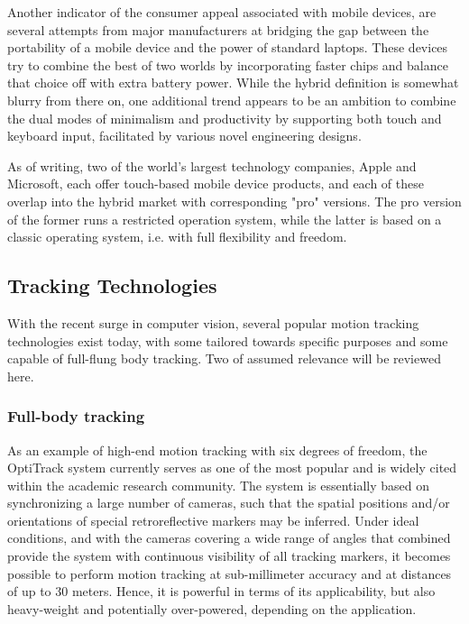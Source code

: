 Another indicator of the consumer appeal associated with mobile devices, are several attempts from major manufacturers at bridging the gap between the portability of a mobile device and the power of standard laptops. These devices try to combine the best of two worlds by incorporating faster chips and balance that choice off with extra battery power. While the hybrid definition is somewhat blurry from there on, one additional trend appears to be an ambition to combine the dual modes of minimalism and productivity by supporting both touch and keyboard input, facilitated by various novel engineering designs.

As of writing, two of the world's largest technology companies, Apple and Microsoft, each offer touch-based mobile device products, and each of these overlap into  the hybrid market with corresponding "pro" versions. The pro version of the former runs a restricted operation system, while the latter is based on a classic operating system, i.e. with full flexibility and freedom. 

\subsection{Tracking Technologies}

With the recent surge in computer vision, several popular motion tracking technologies exist today, with some tailored towards specific purposes and some capable of full-flung body tracking. Two of assumed relevance will be reviewed here.

\subsubsection{Full-body tracking}

As an example of high-end motion  tracking with six degrees of freedom, the OptiTrack system currently serves as one of the most popular and is widely cited within the academic research community. 
The system is essentially based on synchronizing a large number of cameras, such that the spatial positions and/or orientations of special retroreflective markers may be inferred. Under ideal conditions, and with the cameras covering a wide range of angles that combined provide the system with continuous visibility of all tracking markers,  it becomes possible to perform motion tracking at sub-millimeter accuracy and at distances of up to 30 meters\cite{OptiTrackSupport}. Hence, it is powerful in terms of its applicability, but also heavy-weight and potentially over-powered, depending on the application.

